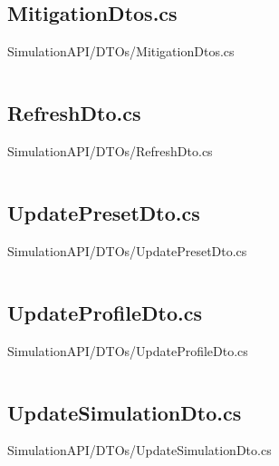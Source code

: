 \inputminted[linenos,breaklines,tabsize=2]{csharp}{/Users/Henry/Desktop/NEAComputerScience/SimulationAPI/DTOs/CreateSimulationDto.cs}

\makeatletter
\subsection*{MitigationDtos.cs}
SimulationAPI/DTOs/MitigationDtos.cs
\def\@currentlabelname{MitigationDtos.cs}
\label{code:SimulationAPI:DTOs:MitigationDtos.cs}
\makeatother

\inputminted[linenos,breaklines,tabsize=2]{csharp}{/Users/Henry/Desktop/NEAComputerScience/SimulationAPI/DTOs/MitigationDtos.cs}

\makeatletter
\subsection*{RefreshDto.cs}
SimulationAPI/DTOs/RefreshDto.cs
\def\@currentlabelname{RefreshDto.cs}
\label{code:SimulationAPI:DTOs:RefreshDto.cs}
\makeatother

\inputminted[linenos,breaklines,tabsize=2]{csharp}{/Users/Henry/Desktop/NEAComputerScience/SimulationAPI/DTOs/RefreshDto.cs}

\makeatletter
\subsection*{UpdatePresetDto.cs}
SimulationAPI/DTOs/UpdatePresetDto.cs
\def\@currentlabelname{UpdatePresetDto.cs}
\label{code:SimulationAPI:DTOs:UpdatePresetDto.cs}
\makeatother

\inputminted[linenos,breaklines,tabsize=2]{csharp}{/Users/Henry/Desktop/NEAComputerScience/SimulationAPI/DTOs/UpdatePresetDto.cs}

\makeatletter
\subsection*{UpdateProfileDto.cs}
SimulationAPI/DTOs/UpdateProfileDto.cs
\def\@currentlabelname{UpdateProfileDto.cs}
\label{code:SimulationAPI:DTOs:UpdateProfileDto.cs}
\makeatother

\inputminted[linenos,breaklines,tabsize=2]{csharp}{/Users/Henry/Desktop/NEAComputerScience/SimulationAPI/DTOs/UpdateProfileDto.cs}

\makeatletter
\subsection*{UpdateSimulationDto.cs}
SimulationAPI/DTOs/UpdateSimulationDto.cs
\def\@currentlabelname{UpdateSimulationDto.cs}
\label{code:SimulationAPI:DTOs:UpdateSimulationDto.cs}
\makeatother

